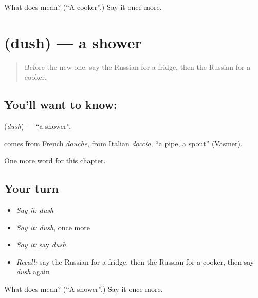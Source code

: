 \begin{tcolorbox}[breakable,colback=teal!4,colframe=teal!35!black,title={Before you move on}]
What does  mean? (\textquotedblleft{}A cooker\textquotedblright{}.) Say it once more.
\end{tcolorbox}
\section[\texorpdfstring{\ru{душ} (dush)}{душ (dush)}]{ (dush) — a shower}

\label{lesson:RU-C94-shower}



\begin{quote}
Before the new one: say the Russian for a fridge, then the Russian for a cooker.
\end{quote}

\subsection*{You'll want to know: }
\textbf{} (\emph{dush}) — \textquotedblleft{}a shower\textquotedblright{}.

\begin{cousinweb}
\textbf{} comes from French \emph{douche}, from Italian \emph{doccia}, \textquotedblleft{}a pipe, a spout\textquotedblright{} (Vasmer).
\end{cousinweb}

\begin{grammarlens}[title={What you've built}]
One more word for this chapter.
\end{grammarlens}

\subsection*{Your turn}
\begin{itemize}
\raggedright
  \item \emph{Say it:} \emph{dush}
  \item \emph{Say it:} \emph{dush}, once more
  \item \emph{Say it:} say \emph{dush}
  \item \emph{Recall:} say the Russian for a fridge, then the Russian for a cooker, then say \emph{dush} again
\end{itemize}

\begin{tcolorbox}[breakable,colback=teal!4,colframe=teal!35!black,title={Before you move on}]
What does  mean? (\textquotedblleft{}A shower\textquotedblright{}.) Say it once more.
\end{tcolorbox}

